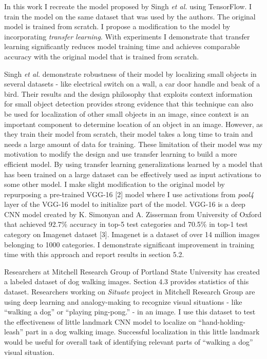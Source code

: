 \documentclass [11pt,letterpaper ,twoside ,openany ]{report}
\begin{document}
    In this work I recreate the model proposed by Singh \textit {et al.} using TensorFlow\textsuperscript{\textregistered}. I train the model on the same dataset that was used by the authors. The original model is trained from scratch. I propose a modification to the model by incorporating \textit {transfer learning}. With experiments I demonstrate that transfer learning  significantly reduces model training time and achieves comparable accuracy with the original model that is trained from scratch.  

    Singh \textit {et al.} demonstrate robustness of their model by localizing small objects in several datasets - like electrical switch on a wall, a car door handle and beak of a bird. Their results and the design philosophy that exploits context information for small object detection provides strong evidence that this technique can also be used for localization of other small objects in an image, since context is an important component to determine location of an object in an image. However, as they train their model from scratch, their model takes a long time to train and needs a large amount of data for training.  These limitation of their model was my motivation to modify the design and use transfer learning to build a more efficient model. By using transfer learning generalizations learned by a model that has been trained on a large dataset can be effectively used as input activations to some other model. I make slight modification to the original model by repurposing a pre-trained VGG-16 [2] model where I use activations from \textit{pool4} layer of the VGG-16 model to initialize part of the model. VGG-16 is a deep CNN model created by K. Simonyan and A. Zisserman from University of Oxford that achieved 92.7\% accuracy in top-5 test categories and 70.5\% in top-1 test category on Imagenet dataset [3]. Imagenet is a dataset of over 14 million images belonging to 1000 categories. I demonstrate significant improvement in training time with this approach and report results in section 5.2.

    Researchers at Mitchell Research Group of Portland State University has created a labeled dataset of dog walking images. Section 4.3 provides statistics of this dataset. Researchers working on \textit {Situate} project in Mitchell Research Group are using deep learning and analogy-making to recognize visual situations - like ``walking a dog'' or ``playing ping-pong.'' - in an image. I use this dataset to test the effectiveness of little landmark CNN model to localize on ``hand-holding-leash'' part in a dog walking image. Successful localization in this little landmark would be useful for overall task of identifying relevant parts of ``walking a dog'' visual situation.
\end{document}
